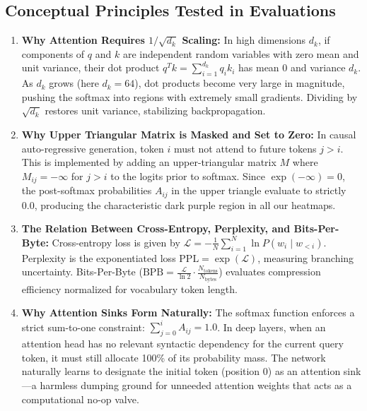 \documentclass[10pt,a4paper]{article}
\begin{document}
\subsection{Conceptual Principles Tested in Evaluations}
\begin{enumerate}[noitemsep,leftmargin=*]
    \item \textbf{Why Attention Requires $1/\sqrt{d_k}$ Scaling:} In high dimensions $d_k$, if components of $q$ and $k$ are independent random variables with zero mean and unit variance, their dot product $q^T k = \sum_{i=1}^{d_k} q_i k_i$ has mean 0 and variance $d_k$. As $d_k$ grows (here $d_k=64$), dot products become very large in magnitude, pushing the softmax into regions with extremely small gradients. Dividing by $\sqrt{d_k}$ restores unit variance, stabilizing backpropagation.
    \item \textbf{Why Upper Triangular Matrix is Masked and Set to Zero:} In causal auto-regressive generation, token $i$ must not attend to future tokens $j > i$. This is implemented by adding an upper-triangular matrix $M$ where $M_{ij} = -\infty$ for $j > i$ to the logits prior to softmax. Since $\exp(-\infty) = 0$, the post-softmax probabilities $A_{ij}$ in the upper triangle evaluate to strictly $0.0$, producing the characteristic dark purple region in all our heatmaps.
    \item \textbf{The Relation Between Cross-Entropy, Perplexity, and Bits-Per-Byte:} Cross-entropy loss is given by $\mathcal{L} = -\frac{1}{N} \sum_{i=1}^N \ln P(w_i \mid w_{<i})$. Perplexity is the exponentiated loss $\text{PPL} = \exp(\mathcal{L})$, measuring branching uncertainty. Bits-Per-Byte ($\text{BPB} = \frac{\mathcal{L}}{\ln 2} \cdot \frac{N_{\text{tokens}}}{N_{\text{bytes}}}$) evaluates compression efficiency normalized for vocabulary token length.
    \item \textbf{Why Attention Sinks Form Naturally:} The softmax function enforces a strict sum-to-one constraint: $\sum_{j=0}^{i} A_{ij} = 1.0$. In deep layers, when an attention head has no relevant syntactic dependency for the current query token, it must still allocate 100\% of its probability mass. The network naturally learns to designate the initial token (position 0) as an attention sink---a harmless dumping ground for unneeded attention weights that acts as a computational no-op valve.
\end{enumerate}
\end{document}

